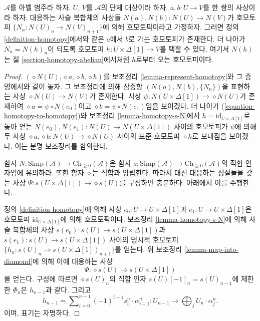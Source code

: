 \begin{lemma}
\label{lemma-backwards-homotopy}
$\mathcal{A}$를 아벨 범주라 하자. $U$, $V$를 $\mathcal{A}$의 단체
대상이라 하자. $a, b : U \to V$를 한 쌍의 사상이라 하자.
대응하는 사슬 복합체의 사상들
$N(a), N(b) : N(U) \to N(V)$가 호모토피
$\{N_n : N(U)_n \to N(V)_{n + 1}\}$에 의해 호모토픽이라고 가정하자.
그러면 정의 \ref{definition-homotopy}에서와 같은 $a$에서 $b$로 가는
호모토피가 존재한다. 더 나아가 $N_n = N(h)_n$이 되도록 호모토피
$h : U \times \Delta[1] \to V$를 택할 수 있다. 여기서 $N(h)$는 절
\ref{section-homotopy-abelian}에서처럼 $h$로부터 오는 호모토피이다.
\end{lemma}

\begin{proof}
$(\diamond N(U), \diamond a, \diamond b, \diamond h)$를 보조정리
\ref{lemma-represent-homotopy}와 그 증명에서와 같이 놓자. 그 보조정리에
의해 삼중항 $(N(a), N(b), \{N_n\})$을 표현하는 사상
$\diamond N(U) \to N(V)$가 존재한다. 사상
$\psi : N(U \times \Delta[1]) \to \diamond{N(U)}$가 존재하여
$\diamond a = \psi \circ N(e_0)$이고
$\diamond b = \psi \circ N(e_1)$임을 보이겠다. 더 나아가
(\ref{equation-homotopy-to-homotopy})와 보조정리
\ref{lemma-homotopy-s-N}에서 $h = \text{id}_{U \times \Delta[1]}$로
놓아 얻는 $N(e_0), N(e_1) : N(U) \to N(U \times \Delta[1])$ 사이의
호모토피가 $\psi$에 의해 두 사상
$\diamond a, \diamond b : N(U) \to \diamond{N(U)}$ 사이의 표준
호모토피 $\diamond h$로 보내짐을 보이겠다. 이는 분명 보조정리를 함의한다.

\medskip\noindent
함자 $N : \text{Simp}(\mathcal{A}) \to \text{Ch}_{\geq 0}(\mathcal{A})$은
함자 $s : \text{Simp}(\mathcal{A}) \to \text{Ch}_{\geq 0}(\mathcal{A})$의
직합 인자임에 유의하라. 또한 함자 $\diamond$는 직합과 양립한다.
따라서 대신 대응하는 성질들을 갖는 사상
$\Psi : s(U \times \Delta[1]) \to \diamond{s(U)}$를 구성하면 충분하다.
아래에서 이를 수행한다.

\medskip\noindent
정의 \ref{definition-homotopy}에 의해 사상
$e_0 : U \to U \times \Delta[1]$과
$e_1 : U \to U \times \Delta[1]$은 호모토피
$\text{id}_{U \times \Delta[1]}$에 의해 호모토픽이다. 보조정리
\ref{lemma-homotopy-s-N}에 의해 사슬 복합체의 사상
$s(e_0) : s(U) \to s(U \times \Delta[1])$과
$s(e_1) : s(U) \to s(U \times \Delta[1])$ 사이의 명시적 호모토피
$\{h_n : s(U)_n \to s(U \times \Delta[1])_{n + 1}\}$를 얻는다.
위 보조정리 \ref{lemma-map-into-diamond}에 의해 이에 대응하는 사상
$$
\Phi : \diamond{s(U)} \to s(U \times \Delta[1])
$$
을 얻는다. 구성에 따르면 $\diamond{s(U)}_n$의 직합 인자
$s(U)[-1]_n = s(U)_{n - 1}$에 제한한 $\Phi_n$은 $h_{n - 1}$과 같다.
그리고
$$
h_{n - 1} = \sum\nolimits_{i = 0}^{n - 1}
(-1)^{i + 1} s^n_i \cdot \alpha^n_{i + 1} :
U_{n - 1} \to \bigoplus\nolimits_j U_n \cdot \alpha^n_j.
$$
이며, 표기는 자명하다.


\end{proof}
